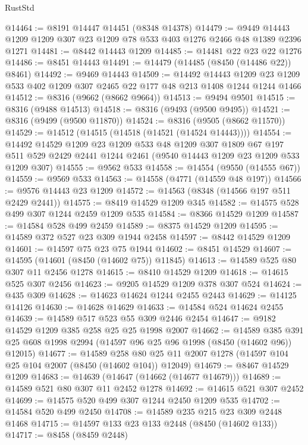 \begin{lexlean}{RustStd}
\begin{coremodule}
@14464 := @8191 @14447 @14451 (@8348 @14378)
@14479 := @9449 @14443 @1209 @1209 @307 @23 @1209 @78 @533 @403 @1276 @2466 @48 @1389 @2396 @1271
@14481 := @8442 @14443 @1209
@14485 := @14481 @22 @23 @22 @1276
@14486 := @8451 @14443
@14491 := @14479 (@14485 (@8450 (@14486 @22)) @8461)
@14492 := @9469 @14443
@14509 := @14492
    @14443
    @1209
    @23
    @1209
    @533
    @402
    @1209
    @307
    @2465
    @22
    @177
    @48
    @213
    @1408
    @1244
    @1244
    @1466
@14512 := @8316 (@9662 (@8662 @9664))
@14513 := @9494 @9501
@14515 := @8316 (@9488 @14513)
@14518 := @8316 (@9493 (@9500 @9495))
@14521 := @8316 (@9499 (@9500 @11870))
@14524 := @8316 (@9505 (@8662 @11570))
@14529 := @14512 (@14515 (@14518 (@14521 (@14524 @14443))))
@14554 := @14492
    @14529
    @1209
    @23
    @1209
    @533
    @48
    @1209
    @307
    @1809
    @67
    @197
    @511
    @529
    @2429
    @2441
    @1244
    @2461
    (@9540 @14443 @1209 @23 @1209 @533 @1209 @307)
@14555 := @9562 @533
@14558 := @14554 (@9550 (@14555 @67))
@14559 := @9569 @533
@14563 := @14558 (@4771 (@14559 @48 @197))
@14566 := @9576 @14443 @23 @1209
@14572 := @14563 (@8348 (@14566 @197 @511 @2429 @2441))
@14575 := @8419 @14529 @1209 @345
@14582 := @14575 @528 @499 @307 @1244 @2459 @1209 @535
@14584 := @8366 @14529 @1209
@14587 := @14584 @528 @499 @2459
@14589 := @8375 @14529 @1209
@14595 := @14589 @372 @527 @23 @309 @1944 @2458
@14597 := @8442 @14529 @1209
@14601 := @14597 @75 @23 @75 @1944
@14602 := @8451 @14529
@14607 := @14595 (@14601 (@8450 (@14602 @75)) @11845)
@14613 := @14589 @525 @80 @307 @11 @2456 @1278
@14615 := @8410 @14529 @1209
@14618 := @14615 @525 @307 @2456
@14623 := @9205 @14529 @1209 @378 @307 @524
@14624 := @435 @309
@14628 := @14623 @14624 @1244 @2455 @2443
@14629 := @14125 @14126
@14630 := @14628 @14629
@14633 := @14584 @524 @14624 @2455
@14639 := @14589 @517 @523 @55 @309 @2446 @2454
@14647 := @9182 @14529 @1209 @385 @258 @25 @25 @1998 @2007
@14662 := @14589
    @385
    @391
    @25
    @608
    @1998
    @2994
    (@14597 @96 @25 @96 @1998 (@8450 (@14602 @96)) @12015)
@14677 := @14589
    @258
    @80
    @25
    @11
    @2007
    @1278
    (@14597 @104 @25 @104 @2007 (@8450 (@14602 @104)) @12049)
@14679 := @8467 @14529 @1209
@14683 := @14639 (@14647 (@14662 (@14677 @14679)))
@14689 := @14589 @521 @80 @307 @11 @2452 @1278
@14692 := @14615 @521 @307 @2452
@14699 := @14575 @520 @499 @307 @1244 @2450 @1209 @535
@14702 := @14584 @520 @499 @2450
@14708 := @14589 @235 @215 @23 @309 @2448 @1468
@14715 := @14597 @133 @23 @133 @2448 (@8450 (@14602 @133))
@14717 := @8458 (@8459 @2448)

\end{coremodule}
\end{lexlean}
